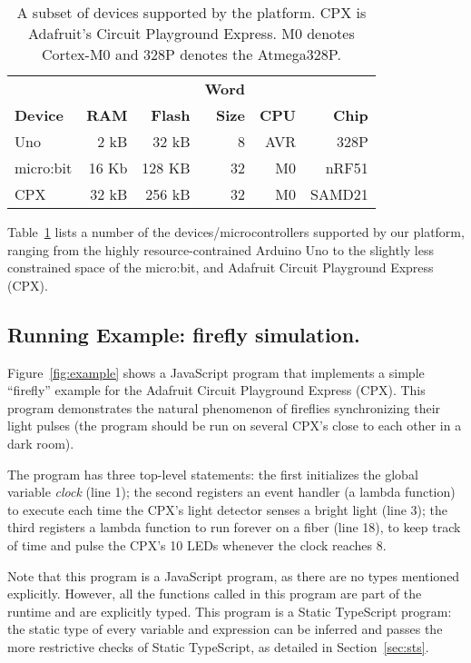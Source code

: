 \begin{table}[]
\centering
\begin{tabular}{|l|r|r|r|r|r|}
\hline
            &          &            & \bf{Word} &          &             \\
\bf{Device} & \bf{RAM} & \bf{Flash} & \bf{Size} & \bf{CPU} & \bf{Chip}   \\ \hline
Uno         & 2 kB     & 32 kB      & 8         & AVR      & 328P  \\ \hline
micro:bit   & 16 Kb    & 128 KB     & 32        & M0       & nRF51       \\ \hline
CPX         & 32 kB    & 256 kB     & 32        & M0       & SAMD21      \\ \hline
\end{tabular}
\caption{\label{table:devices}A subset of devices supported by the platform.
CPX is Adafruit's Circuit Playground Express. M0 denotes Cortex-M0 and 328P denotes
the Atmega328P.}
\end{table}

Table~\ref{table:devices} lists a number of the devices/microcontrollers supported by our platform, 
ranging from the highly resource-contrained Arduino Uno to the slightly less constrained space of
the micro:bit, and Adafruit Circuit Playground Express (CPX).

\subsection{Running Example: firefly simulation.}

Figure~\ref{fig:example} shows a JavaScript
program that implements a simple ``firefly'' example
for the Adafruit Circuit Playground Express (CPX).
This program demonstrates the natural phenomenon
of fireflies synchronizing their light pulses (the program should be
run on several CPX's close to each other in a dark room).

The program has three top-level statements:
the first initializes the global variable \emph{clock} (line 1); the
second registers an event handler (a lambda function) to execute
each time the CPX's light detector senses a bright light (line 3); the
third registers a lambda function to run forever on a fiber (line 18),
to keep track of time and pulse the CPX's 10 LEDs whenever the
clock reaches 8.  

Note that this program is a JavaScript program, as there are no
types mentioned explicitly. However, all the functions called in
this program are part of the runtime and are explicitly
typed. This program is a Static TypeScript program:
the static type of every variable and expression
can be inferred and passes the more restrictive checks
of Static TypeScript, as detailed in Section~\ref{sec:sts}.

